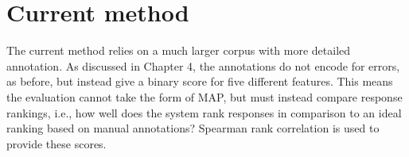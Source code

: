 %


\section{Current method}

The current method relies on a much larger corpus with more detailed annotation. As discussed in Chapter 4, the annotations do not encode for errors, as before, but instead give a binary score for five different features. This means the evaluation cannot take the form of MAP, but must instead compare response rankings, i.e., how well does the system rank responses in comparison to an ideal ranking based on manual annotations? Spearman rank correlation is used to provide these scores.

